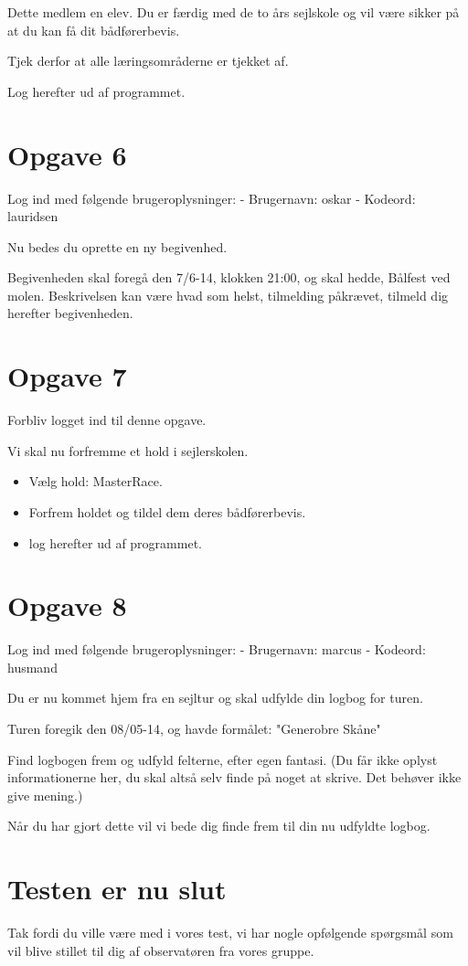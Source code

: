 Dette medlem en elev. Du er færdig med de to års sejlskole og vil være sikker på at du kan få dit bådførerbevis.

Tjek derfor at alle læringsområderne er tjekket af.

Log herefter ud af programmet.


\section{Opgave 6}

Log ind med følgende brugeroplysninger: 
\newline - Brugernavn: oskar
\newline - Kodeord: lauridsen

Nu bedes du oprette en ny begivenhed.

Begivenheden skal foregå den 7/6-14, klokken 21:00, og skal hedde, Bålfest ved molen. Beskrivelsen kan være hvad som helst, tilmelding påkrævet, tilmeld dig herefter begivenheden.


\section{Opgave 7}

Forbliv logget ind til denne opgave.

Vi skal nu forfremme et hold i sejlerskolen.

\begin{itemize}
\item Vælg hold: MasterRace.
\item Forfrem holdet og tildel dem deres bådførerbevis.
\item log herefter ud af programmet.
\end{itemize}

\section{Opgave 8}

Log ind med følgende brugeroplysninger: 
\newline - Brugernavn: marcus
\newline - Kodeord: husmand

Du er nu kommet hjem fra en sejltur og skal udfylde din logbog for turen.

Turen foregik den 08/05-14, og havde formålet: "Generobre Skåne"

Find logbogen frem og udfyld felterne, efter egen fantasi. (Du får ikke oplyst informationerne her, du skal altså selv finde på noget at skrive. Det behøver ikke give mening.)

Når du har gjort dette vil vi bede dig finde frem til din nu udfyldte logbog. 

\section{Testen er nu slut}

Tak fordi du ville være med i vores test, vi har nogle opfølgende spørgsmål som vil blive stillet til dig af observatøren fra vores gruppe.

